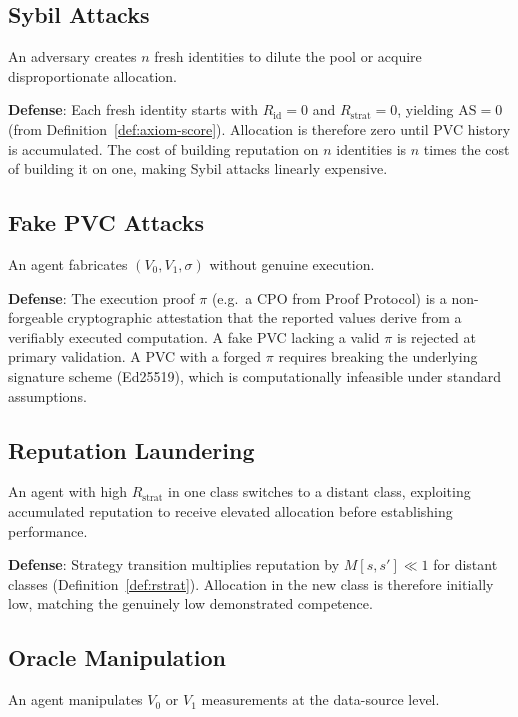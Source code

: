 \documentclass[11pt,a4paper]{article}
\theoremstyle{plain}
\theoremstyle{definition}
\theoremstyle{remark}
\newcommand{\AS}{\mathrm{AS}}
\newcommand{\Rid}{R_{\mathrm{id}}}
\newcommand{\Rstrat}{R_{\mathrm{strat}}}
\begin{document}
\subsection{Sybil Attacks}

An adversary creates $n$ fresh identities to dilute the pool or acquire
disproportionate allocation.

\textbf{Defense}: Each fresh identity starts with $\Rid = 0$ and $\Rstrat = 0$,
yielding $\AS = 0$ (from Definition~\ref{def:axiom-score}). Allocation is
therefore zero until PVC history is accumulated. The cost of building
reputation on $n$ identities is $n$ times the cost of building it on one,
making Sybil attacks linearly expensive.

\subsection{Fake PVC Attacks}

An agent fabricates $(V_0, V_1, \sigma)$ without genuine execution.

\textbf{Defense}: The execution proof $\pi$ (e.g.\ a CPO from Proof Protocol)
is a non-forgeable cryptographic attestation that the reported values derive
from a verifiably executed computation. A fake PVC lacking a valid $\pi$ is
rejected at primary validation. A PVC with a forged $\pi$ requires breaking
the underlying signature scheme (Ed25519), which is computationally
infeasible under standard assumptions.

\subsection{Reputation Laundering}

An agent with high $\Rstrat$ in one class switches to a distant class, exploiting
accumulated reputation to receive elevated allocation before establishing
performance.

\textbf{Defense}: Strategy transition multiplies reputation by $M[s, s'] \ll 1$
for distant classes (Definition~\ref{def:rstrat}). Allocation in the new class
is therefore initially low, matching the genuinely low demonstrated competence.

\subsection{Oracle Manipulation}

An agent manipulates $V_0$ or $V_1$ measurements at the data-source level.
\end{document}
